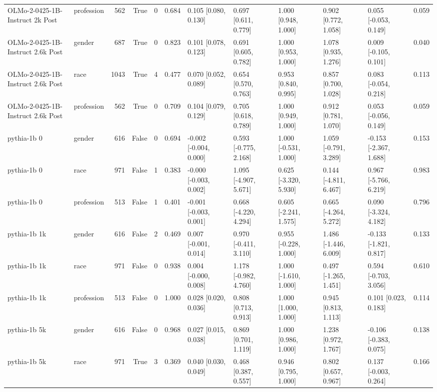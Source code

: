 \begin{tabular}{llrrrrlllllr}
OLMo-2-0425-1B-Instruct 2k Post & profession & 562 & True & 0 & 0.684 & 0.105 [0.080, 0.130] & 0.697 [0.611, 0.779] & 1.000 [0.948, 1.000] & 0.902 [0.772, 1.058] & 0.055 [-0.053, 0.149] & 0.059 \\
OLMo-2-0425-1B-Instruct 2.6k Post & gender & 687 & True & 0 & 0.823 & 0.101 [0.078, 0.123] & 0.691 [0.605, 0.782] & 1.000 [0.953, 1.000] & 1.078 [0.935, 1.276] & 0.009 [-0.105, 0.101] & 0.040 \\
OLMo-2-0425-1B-Instruct 2.6k Post & race & 1043 & True & 4 & 0.477 & 0.070 [0.052, 0.089] & 0.654 [0.570, 0.763] & 0.953 [0.840, 0.995] & 0.857 [0.700, 1.028] & 0.083 [-0.054, 0.218] & 0.113 \\
OLMo-2-0425-1B-Instruct 2.6k Post & profession & 562 & True & 0 & 0.709 & 0.104 [0.079, 0.129] & 0.705 [0.618, 0.789] & 1.000 [0.949, 1.000] & 0.912 [0.781, 1.070] & 0.053 [-0.056, 0.149] & 0.059 \\
pythia-1b 0 & gender & 616 & False & 0 & 0.694 & -0.002 [-0.004, 0.000] & 0.593 [-0.775, 2.168] & 1.000 [-0.531, 1.000] & 1.059 [-0.791, 3.289] & -0.153 [-2.367, 1.688] & 0.153 \\
pythia-1b 0 & race & 971 & False & 1 & 0.383 & -0.000 [-0.003, 0.002] & 1.095 [-4.907, 5.671] & 0.625 [-3.320, 5.930] & 0.144 [-4.811, 6.467] & 0.967 [-5.766, 6.219] & 0.983 \\
pythia-1b 0 & profession & 513 & False & 1 & 0.401 & -0.001 [-0.003, 0.001] & 0.668 [-4.220, 4.294] & 0.605 [-2.241, 1.575] & 0.665 [-4.264, 5.272] & 0.090 [-3.324, 4.182] & 0.796 \\
pythia-1b 1k & gender & 616 & False & 2 & 0.469 & 0.007 [-0.001, 0.014] & 0.970 [-0.411, 3.110] & 0.955 [-0.228, 1.000] & 1.486 [-1.446, 6.009] & -0.133 [-1.821, 0.817] & 0.133 \\
pythia-1b 1k & race & 971 & False & 0 & 0.938 & 0.004 [-0.000, 0.008] & 1.178 [-0.982, 4.760] & 1.000 [-1.610, 1.000] & 0.497 [-1.265, 1.451] & 0.594 [-0.703, 3.056] & 0.610 \\
pythia-1b 1k & profession & 513 & False & 0 & 1.000 & 0.028 [0.020, 0.036] & 0.808 [0.713, 0.913] & 1.000 [1.000, 1.000] & 0.945 [0.813, 1.113] & 0.101 [0.023, 0.183] & 0.114 \\
pythia-1b 5k & gender & 616 & False & 0 & 0.968 & 0.027 [0.015, 0.038] & 0.869 [0.701, 1.119] & 1.000 [0.986, 1.000] & 1.238 [0.972, 1.767] & -0.106 [-0.383, 0.075] & 0.138 \\
pythia-1b 5k & race & 971 & True & 3 & 0.369 & 0.040 [0.030, 0.049] & 0.468 [0.387, 0.557] & 0.946 [0.795, 1.000] & 0.802 [0.657, 0.967] & 0.137 [-0.003, 0.264] & 0.166 \\

\end{tabular}
